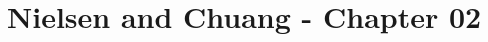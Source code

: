 \section{Nielsen and Chuang - Chapter 02} 
\label{sec:nielsen-and-chuang-chapter-2}








\pagebreak